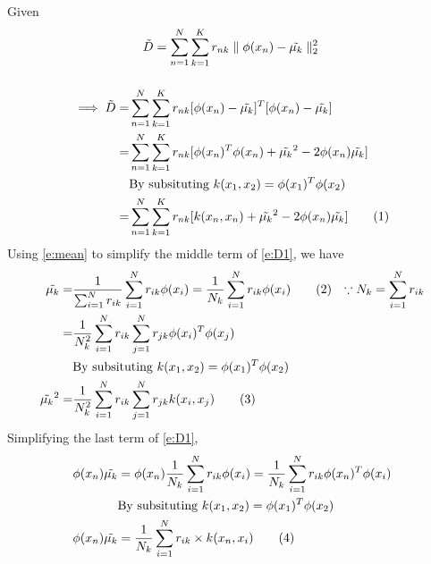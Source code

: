 \documentclass[a4paper,doc,notimes]{article}
\newcommand\numberthis{\addtocounter{equation}{1}\tag{\theequation}}
\begin{document}
\subsection{}

Given
\begin{equation}
	\tilde{D} = \sum_{n=1}^{N} \sum_{k=1}^{K} r_{nk} \parallel\phi(x_n) - \tilde{\mu_k} \parallel_2^2 \\
\end{equation}
\subsubsection{}
\begin{align*}
\implies \tilde{D} = & \sum_{n=1}^{N} \sum_{k=1}^{K} r_{nk} [\phi(x_n) - \tilde{\mu_k}]^T [\phi(x_n) - \tilde{\mu_k}] \\
 =& \sum_{n=1}^{N} \sum_{k=1}^{K} r_{nk} [\phi(x_n)^T\phi(x_n) + \tilde{\mu_k}^2 - 2 \phi(x_n) \tilde{\mu_k} ] \\
  & \text{By subsituting } k(x_1, x_2) = \phi(x_1)^T\phi(x_2) \\
 =& \sum_{n=1}^{N} \sum_{k=1}^{K} r_{nk} [k(x_n, x_n) + \tilde{\mu_k}^2 - 2 \phi(x_n) \tilde{\mu_k} ] \numberthis \label{e:D1} \\
\end{align*}
Using \ref{e:mean} to simplify the middle term of \ref{e:D1}, we have 
\begin{align*}
	\tilde{\mu_k} =& \frac{1}{\sum_{i=1}^{N} r_{ik}} \sum_{i=1}^{N} r_{ik} \phi(x_i) 
				 = \frac{1}{N_k} \sum_{i=1}^{N} r_{ik} \phi(x_i) \numberthis \label{e:mean2}& \space  \because N_k = \sum_{i=1}^{N} r_{ik} \\	
 =& \frac{1}{N_k^2} \sum_{i=1}^{N} r_{ik} \sum_{j=1}^{N} r_{jk} \phi(x_i)^T\phi(x_j) \\ 
 & \text{By subsituting } k(x_1, x_2) = \phi(x_1)^T\phi(x_2) \\
 \tilde{\mu_k}^2 =& \frac{1}{N_k^2} \sum_{i=1}^{N} r_{ik} \sum_{j=1}^{N} r_{jk} k(x_i, x_j) \numberthis \label{e:D2}
\end{align*}
Simplifying the last term of \ref{e:D1},
\begin{align*}
 \phi(x_n) \tilde{\mu_k} & = \phi(x_n) \frac{1}{N_k} \sum_{i=1}^{N} r_{ik} \phi(x_i) = \frac{1}{N_k} \sum_{i=1}^{N} r_{ik} \phi(x_n)^T \phi(x_i) \\
 & \text{By subsituting } k(x_1, x_2) = \phi(x_1)^T\phi(x_2) \\
\phi(x_n) \tilde{\mu_k} &= \frac{1}{N_k} \sum_{i=1}^{N} r_{ik} \times k(x_n, x_i) \numberthis \label{e:D3}
\end{align*}
\end{document}
